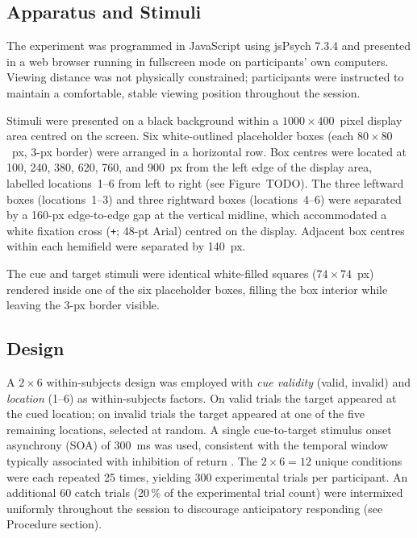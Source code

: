 \documentclass[12pt, a4paper]{article}
\begin{document}
\subsection{Apparatus and Stimuli}

The experiment was programmed in JavaScript using jsPsych 7.3.4
\parencite{deleeuw2015jspsych} and presented in a web browser running
in fullscreen mode on participants' own computers.
Viewing distance was not physically constrained; participants were
instructed to maintain a comfortable, stable viewing position throughout
the session.

Stimuli were presented on a black background within a
$1000 \times 400$~pixel display area centred on the screen.
Six white-outlined placeholder boxes (each $80 \times 80$~px, 3-px
border) were arranged in a horizontal row.
Box centres were located at 100, 240, 380, 620, 760, and 900~px from
the left edge of the display area, labelled locations~1--6 from left
to right (see Figure~TODO).
The three leftward boxes (locations~1--3) and three rightward boxes
(locations~4--6) were separated by a 160-px edge-to-edge gap at the
vertical midline, which accommodated a white fixation cross
(\texttt{+}; 48-pt Arial) centred on the display.
Adjacent box centres within each hemifield were separated by 140~px.

The cue and target stimuli were identical white-filled squares
($74 \times 74$~px) rendered inside one of the six placeholder boxes,
filling the box interior while leaving the 3-px border visible.

\subsection{Design}

A $2 \times 6$ within-subjects design was employed with
\textit{cue validity} (valid, invalid) and \textit{location}
(1--6) as within-subjects factors.
On valid trials the target appeared at the cued location; on invalid
trials the target appeared at one of the five remaining locations,
selected at random.
A single cue-to-target stimulus onset asynchrony (SOA) of 300~ms was
used, consistent with the temporal window typically associated with
inhibition of return
\parencite[e.g.,][]{posner1984components, klein2000inhibition}.
The $2 \times 6 = 12$ unique conditions were each repeated 25 times,
yielding 300 experimental trials per participant.
An additional 60 catch trials (20\,\% of the experimental trial count)
were intermixed uniformly throughout the session to discourage
anticipatory responding (see Procedure section).
\end{document}
